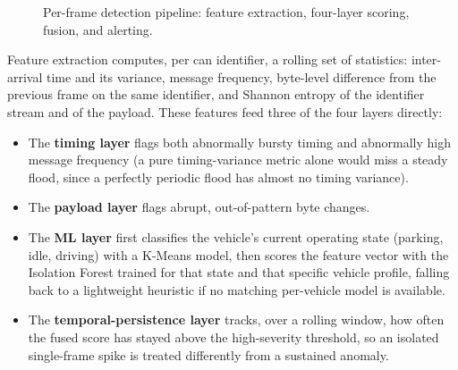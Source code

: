 \begin{figure}[H]
\centering
{}
\caption{Per-frame detection pipeline: feature extraction, four-layer scoring, fusion, and alerting.}
\label{fig:pipeline}
\end{figure}

Feature extraction computes, per \gls{can} identifier, a rolling set of statistics: inter-arrival time and its variance, message frequency, byte-level difference from the previous frame on the same identifier, and Shannon entropy of the identifier stream and of the payload. These features feed three of the four layers directly:

\begin{itemize}
    \item The \textbf{timing layer} flags both abnormally bursty timing and abnormally high message frequency (a pure timing-variance metric alone would miss a steady flood, since a perfectly periodic flood has almost no timing variance).
    \item The \textbf{payload layer} flags abrupt, out-of-pattern byte changes.
    \item The \textbf{ML layer} first classifies the vehicle's current operating state (parking, idle, driving) with a K-Means model, then scores the feature vector with the Isolation Forest trained for that state and that specific vehicle profile, falling back to a lightweight heuristic if no matching per-vehicle model is available.
    \item The \textbf{temporal-persistence layer} tracks, over a rolling window, how often the fused score has stayed above the high-severity threshold, so an isolated single-frame spike is treated differently from a sustained anomaly.
\end{itemize}

